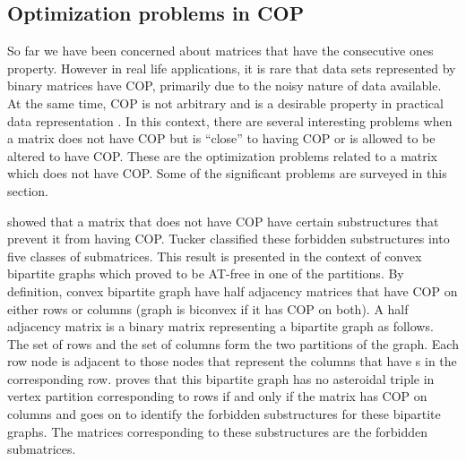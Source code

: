 \subsection{Optimization problems in COP}
\label{sec:optcop}

So far we have been concerned about matrices that have the consecutive
ones property. However in real life applications, it is rare that data
sets represented by binary matrices have COP, primarily due to the
noisy nature of data available. At the same time, COP is not arbitrary
and is a desirable property in practical data representation
\cite{co98,jkckv04,k77}. In this context, there are several
interesting problems when a matrix does not have COP but is ``close''
to having COP or is allowed to be altered to have COP. These are the
optimization problems related to a matrix which does not have
COP. Some of the significant problems are surveyed in this section.

\cite{at72} showed that a matrix that does not have COP have certain
substructures that prevent it from having COP. Tucker classified these
forbidden substructures into five classes of submatrices. This result
is presented in the context of convex bipartite graphs which
\cite{at72} proved to be AT-free in one of the partitions. By
definition, convex bipartite graph have half adjacency matrices that
have COP on either rows or columns (graph is biconvex if it has COP on
both)\cite{d08phd}. A half adjacency matrix is a binary matrix
representing a bipartite graph as follows. The set of rows and the set
of columns form the two partitions of the graph. Each row node is
adjacent to those nodes that represent the columns that have {\un}s in
the corresponding row. \cite{at72} proves that this bipartite graph
has no asteroidal triple in vertex partition corresponding to rows if
and only if the matrix has COP on columns and goes on to identify the
forbidden substructures for these bipartite graphs. The matrices
corresponding to these substructures are the forbidden submatrices.

